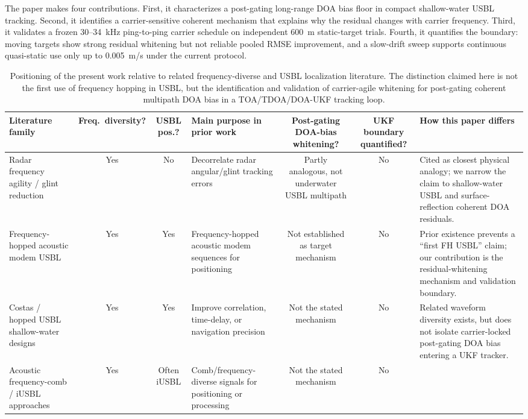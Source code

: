 \documentclass[journal]{IEEEtran}
\begin{document}
The paper makes four contributions. First, it characterizes a post-gating long-range DOA bias
floor in compact shallow-water USBL tracking. Second, it identifies a carrier-sensitive coherent
mechanism that explains why the residual changes with carrier frequency. Third, it validates a
frozen 30--34~kHz ping-to-ping carrier schedule on independent 600~m static-target trials.
Fourth, it quantifies the boundary: moving targets show strong residual whitening but not
reliable pooled RMSE improvement, and a slow-drift sweep supports continuous quasi-static use
only up to 0.005~m/s under the current protocol.

\begin{table}[!t]
\centering
\caption{Positioning of the present work relative to related frequency-diverse and USBL
localization literature. The distinction claimed here is not the first use of frequency hopping
in USBL, but the identification and validation of carrier-agile whitening for post-gating
coherent multipath DOA bias in a TOA/TDOA/DOA-UKF tracking loop.}
\label{tab:priorart}
\scriptsize
\setlength{\tabcolsep}{3.5pt}
\begin{tabularx}{\textwidth}{L c c L c c L}
\toprule
Literature family & Freq.\ diversity? & USBL pos.? & Main purpose in prior work &
Post-gating DOA-bias whitening? & UKF boundary quantified? & How this paper differs \\
\midrule
Radar frequency agility / glint reduction~\cite{Loomis1974FrequencyAgilityGlint} & Yes & No &
Decorrelate radar angular/glint tracking errors & Partly analogous, not underwater USBL
multipath & No & Cited as closest physical analogy; we narrow the claim to shallow-water USBL and
surface-reflection coherent DOA residuals. \\
Frequency-hopped acoustic modem USBL~\cite{Beaujean2007FrequencyHoppedUSBL} & Yes & Yes &
Frequency-hopped acoustic modem sequences for positioning & Not established as target mechanism &
No & Prior existence prevents a ``first FH USBL'' claim; our contribution is the residual-whitening
mechanism and validation boundary. \\
Costas / hopped USBL shallow-water designs~\cite{Nhat2022CostasUSBL} & Yes & Yes & Improve
correlation, time-delay, or navigation precision & Not the stated mechanism & No & Related waveform
diversity exists, but does not isolate carrier-locked post-gating DOA bias entering a UKF tracker. \\
Acoustic frequency-comb / iUSBL approaches~\cite{Qian2025FrequencyCombIUSBL} & Yes & Often iUSBL &
Comb/frequency-diverse signals for positioning or processing & Not the stated mechanism & No &

\end{tabularx}
\end{table}
\end{document}
